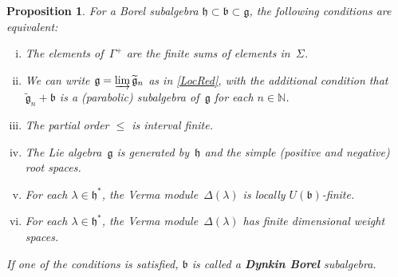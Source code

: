 \documentclass[11pt]{amsart}
\newcommand{\fg}{\mathfrak{g}}
\newcommand{\fh}{\mathfrak{h}}
\newcommand{\fb}{\mathfrak{b}}
\newcommand{\mN}{\mathbb{N}}
\numberwithin{equation}{section}
\theoremstyle{plain}
\newtheorem{prop}[subsubsection]{Proposition}
\theoremstyle{remark}
\theoremstyle{remark}
\theoremstyle{construction}
\begin{document}
\begin{prop}\label{equivCond}
For a Borel subalgebra $\fh\subset\fb\subset\fg$, the following conditions are equivalent:
\begin{enumerate}[(i)]
\item The elements of~$\Gamma^+$ are the finite sums of elements in~$\Sigma $.
\item We can write $\fg=\varinjlim\widetilde{\fg}_n$ as in \ref{LocRed}, with the additional condition that~$\widetilde{\fg}_n+\fb$ is a (parabolic) subalgebra of~$\fg$ for each $n\in\mN$.
\item The partial order $\le$ is interval finite.
\item The Lie algebra~$\fg$ is generated by~$\fh$ and the simple (positive and negative) root spaces.
\item For each $\lambda\in\fh^\ast$, the Verma module~$\Delta(\lambda)$ is locally $U(\fb)$-finite.
\item For each $\lambda\in\fh^\ast$, the Verma module~$\Delta(\lambda)$ has finite dimensional weight spaces.
\end{enumerate}
If one of the conditions is satisfied, $\fb$ is called a {\bf Dynkin Borel} subalgebra.
\end{prop}
\end{document}
